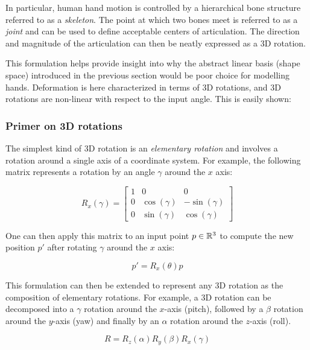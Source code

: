 In particular, human hand motion is controlled by a hierarchical bone structure referred to as a \emph{skeleton}. The point at which two bones meet is referred to as a \emph{joint} and can be used to define acceptable centers of articulation. The direction and magnitude of the articulation can then be neatly expressed as a 3D rotation.

This formulation helps provide insight into why the abstract linear basis (shape space) introduced in the previous section would be poor choice for modelling hands. Deformation is here characterized in terms of 3D rotations, and 3D rotations are non-linear with respect to the input angle. This is easily shown: 

\subsubsection{Primer on 3D rotations}

The simplest kind of 3D rotation is an \emph{elementary rotation} and involves a rotation around a single axis of a coordinate system. For example, the following matrix represents a rotation by an angle $\gamma$ around the $x$ axis:

\begin{equation}
    R_{x}(\gamma) = \begin{bmatrix}
        1 & 0 & 0 \\
        0 & \cos(\gamma) & -\sin(\gamma) \\
        0 & \sin(\gamma) & \cos(\gamma)
    \end{bmatrix}
\end{equation}

One can then apply this matrix to an input point $p \in {\mathbb{R}^{3}}$ to compute the new position $p'$ after rotating $\gamma$ around the $x$ axis:

\begin{equation}
    p' = R_{x}(\theta)p
\end{equation}

This formulation can then be extended to represent any 3D rotation as the composition of elementary rotations. For example, a 3D rotation can be decomposed into a $\gamma$ rotation around the $x$-axis (pitch), followed by a $\beta$ rotation around the $y$-axis (yaw) and finally by an $\alpha$ rotation around the $z$-axis (roll). 

\begin{equation}  
    R = R_{z}(\alpha) R_{y}(\beta) R_{x}(\gamma)
\end{equation}

